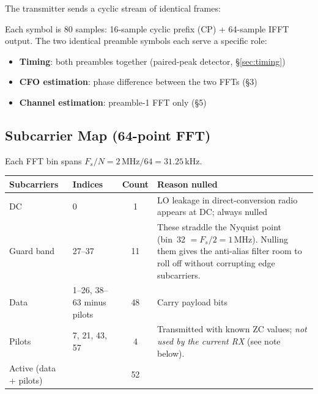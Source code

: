 \documentclass[11pt,a4paper]{article}
\begin{document}
The transmitter sends a cyclic stream of identical frames:

\begin{center}
\end{center}

Each symbol is 80 samples: 16-sample cyclic prefix (CP) + 64-sample IFFT output.
The two identical preamble symbols each serve a specific role:
\begin{itemize}
  \item \textbf{Timing}: both preambles together (paired-peak detector, \S\ref{sec:timing})
  \item \textbf{CFO estimation}: phase difference between the two FFTs (\S3)
  \item \textbf{Channel estimation}: preamble-1 FFT only (\S5)
\end{itemize}

\subsection{Subcarrier Map (64-point FFT)}

Each FFT bin spans $F_s/N = 2\,\text{MHz}/64 = 31.25\,\text{kHz}$.

\begin{center}
\begin{tabular}{p{3.5cm}p{3cm}cp{5cm}}
\toprule
\textbf{Subcarriers} & \textbf{Indices} & \textbf{Count} & \textbf{Reason nulled} \\
\midrule
DC & 0 & 1 & LO leakage in direct-conversion radio appears at DC; always nulled \\
Guard band & 27--37 & 11 &
  These straddle the Nyquist point (bin~32 $= F_s/2 = 1\,\text{MHz}$).
  Nulling them gives the anti-alias filter room to roll off without
  corrupting edge subcarriers. \\
\midrule
Data & 1--26, 38--63 minus pilots & 48 & Carry payload bits \\
Pilots & 7, 21, 43, 57 & 4 &
  Transmitted with known ZC values; \emph{not used by the current RX}
  (see note below). \\
\midrule
Active (data + pilots) & & 52 & \\
\bottomrule
\end{tabular}
\end{center}
\end{document}
